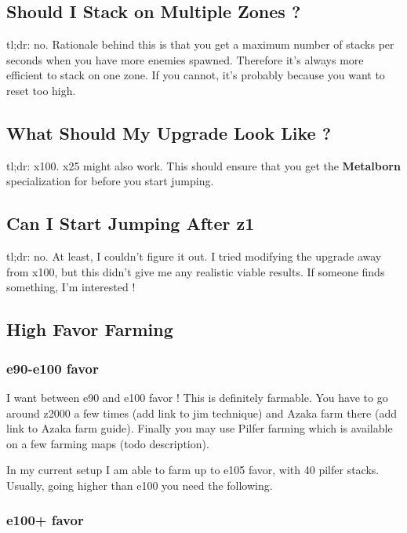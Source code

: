 \documentclass{article}
\begin{document}
\subsection{Should I Stack on Multiple Zones ?}

tl;dr: no.\newline
Rationale behind this is that you get a maximum number of stacks per seconds when you have more enemies spawned.
Therefore it's always more efficient to stack on one zone.
If you cannot, it's probably because you want to reset too high.



\subsection{What Should My Upgrade Look Like ?}

tl;dr: x100.\newline
x25 might also work.
This should ensure that you get the \textbf{Metalborn} specialization for \briv before you start jumping.


\subsection{Can I Start Jumping After z1}

tl;dr: no.\newline
At least, I couldn't figure it out.
I tried modifying the upgrade away from x100, but this didn't give me any realistic viable results.
If someone finds something, I'm interested !


\subsection{High Favor Farming}

\subsubsection{e90-e100 favor}
I want between e90 and e100 favor !
This is definitely farmable.
You have to go around z2000 a few times (add link to jim technique) and Azaka farm there (add link to Azaka farm guide).
Finally you may use Pilfer farming which is available on a few farming maps (todo description).

In my current setup I am able to farm up to e105 favor, with 40 pilfer stacks.
Usually, going higher than e100 you need the following.

\subsubsection{e100+ favor}
\end{document}
